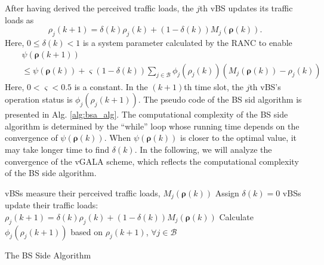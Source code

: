 \documentclass[journal]{IEEEtran}
\theoremstyle{definition}
\begin{document}
After having derived the perceived traffic loads, the $j$th vBS updates its traffic loads as
\begin{equation}
\label{eq:traffic_updates}
\rho_{j}(k+1)=\delta(k)\rho_{j}(k)+(1-\delta(k))M_{j}(\boldsymbol{\rho}(k)).
\end{equation}
Here, $0\leq\delta(k)<1$ is a system parameter calculated by the RANC to enable
\begin{align}
\label{eq:back_line_search}
&\psi(\boldsymbol{\rho}(k+1))\nonumber\\
\;\;\;&\leq \psi(\boldsymbol{\rho}(k))+
\varsigma(1-\delta(k))\sum_{j\in\mathcal{B}} \phi_{j}(\rho_{j}(k))(M_{j}(\boldsymbol{\rho}(k))-\rho_{j}(k))
\end{align}
Here, $0<\varsigma<0.5$ is a constant.
In the $(k+1)$th time slot, the $j$th vBS's operation status is $\phi_{j}(\rho_{j}(k+1))$. The pseudo code of the BS sid algorithm is presented in Alg. \ref{alg:bsa_alg}. The computational complexity of the BS side algorithm is determined by the ``while'' loop whose running time depends on the convergence of $\psi(\boldsymbol{\rho}(k))$. When $\psi(\boldsymbol{\rho}(k))$ is closer to the optimal value, it may take longer time to find $\delta(k)$. In the following, we will analyze the convergence of the vGALA scheme, which reflects the computational complexity of the BS side algorithm.
\begin{algorithm}
\nl vBSs measure their perceived traffic loads, $M_{j}(\boldsymbol{\rho}(k))$\;
\nl Assign $\delta(k)=0$\;
\nl {}
\nl vBSs update their traffic loads: $\rho_{j}(k+1)=\delta(k)\rho_{j}(k)+(1-\delta(k))M_{j}(\boldsymbol{\rho}(k))$\;
\nl Calculate $\phi_{j}(\rho_{j}(k+1))$ based on $\rho_{j}(k+1)$, $\forall j\in\mathcal{B}$\;
\caption{The BS Side Algorithm\label{alg:bsa_alg}}
\end{algorithm}
\end{document}
